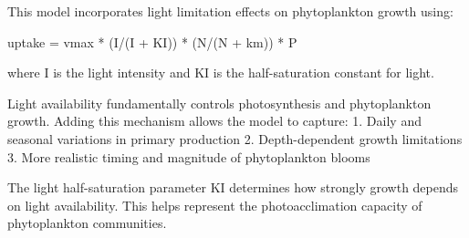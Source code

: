 This model incorporates light limitation effects on phytoplankton growth using:

uptake = vmax * (I/(I + KI)) * (N/(N + km)) * P

where I is the light intensity and KI is the half-saturation constant for light.

Light availability fundamentally controls photosynthesis and phytoplankton growth. Adding this mechanism allows the model to capture:
1. Daily and seasonal variations in primary production
2. Depth-dependent growth limitations
3. More realistic timing and magnitude of phytoplankton blooms

The light half-saturation parameter KI determines how strongly growth depends on light availability. This helps represent the photoacclimation capacity of phytoplankton communities.
